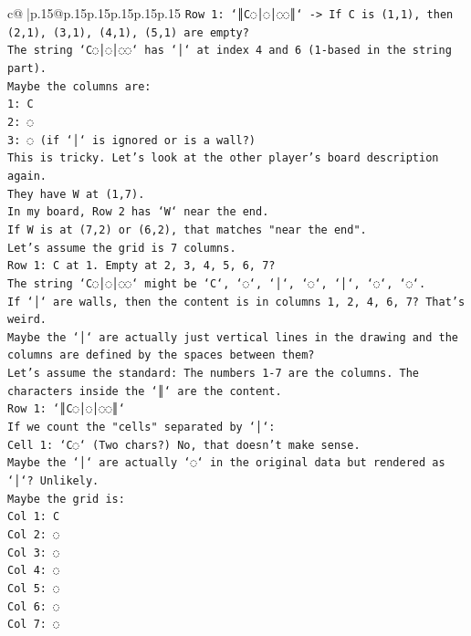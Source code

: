 \documentclass{article}
\begin{document}
{\begin{supertabular}{c@{$\;$}|p{.15\linewidth}@{}p{.15\linewidth}p{.15\linewidth}p{.15\linewidth}p{.15\linewidth}p{.15\linewidth}}
{{{\texttt{Row 1: `║C◌│◌│◌◌║` {-}> If C is (1,1), then (2,1), (3,1), (4,1), (5,1) are empty?} \\
\texttt{The string `C◌│◌│◌◌` has `│` at index 4 and 6 (1{-}based in the string part).} \\
\texttt{Maybe the columns are:} \\
\texttt{1: C} \\
\texttt{2: ◌} \\
\texttt{3: ◌ (if `│` is ignored or is a wall?)} \\
\texttt{This is tricky. Let's look at the other player's board description again.} \\
\texttt{They have W at (1,7).} \\
\texttt{In my board, Row 2 has `W` near the end.} \\
\texttt{If W is at (7,2) or (6,2), that matches "near the end".} \\
\texttt{Let's assume the grid is 7 columns.} \\
\texttt{Row 1: C at 1. Empty at 2, 3, 4, 5, 6, 7?} \\
\texttt{The string `C◌│◌│◌◌` might be `C`, `◌`, `│`, `◌`, `│`, `◌`, `◌`.} \\
\texttt{If `│` are walls, then the content is in columns 1, 2, 4, 6, 7? That's weird.} \\
\texttt{Maybe the `│` are actually just vertical lines in the drawing and the columns are defined by the spaces between them?} \\
\texttt{Let's assume the standard: The numbers 1{-}7 are the columns. The characters inside the `║` are the content.} \\
\texttt{Row 1: `║C◌│◌│◌◌║`} \\
\texttt{If we count the "cells" separated by `│`:} \\
\texttt{Cell 1: `C◌` (Two chars?) No, that doesn't make sense.} \\
\texttt{Maybe the `│` are actually `◌` in the original data but rendered as `│`? Unlikely.} \\
\texttt{Maybe the grid is:} \\
\texttt{Col 1: C} \\
\texttt{Col 2: ◌} \\
\texttt{Col 3: ◌} \\
\texttt{Col 4: ◌} \\
\texttt{Col 5: ◌} \\
\texttt{Col 6: ◌} \\
\texttt{Col 7: ◌} \\
}}}
\end{supertabular}}
\end{document}
